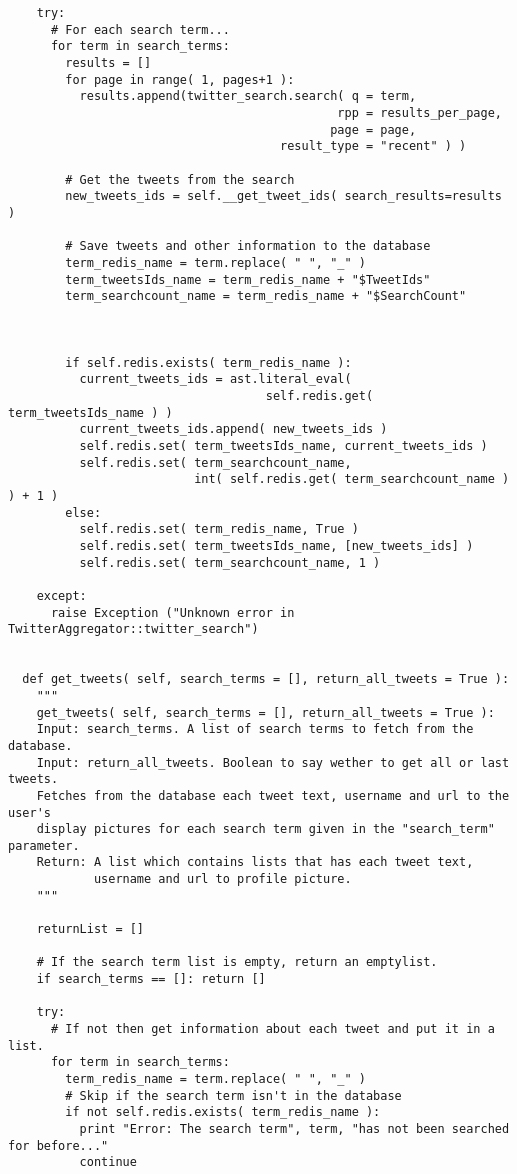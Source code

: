 \begin{verbatim}
    try:
      # For each search term...
      for term in search_terms:
        results = []
        for page in range( 1, pages+1 ):
          results.append(twitter_search.search( q = term, 
                                              rpp = results_per_page, 
                                             page = page, 
                                      result_type = "recent" ) )
        
        # Get the tweets from the search
        new_tweets_ids = self.__get_tweet_ids( search_results=results )
        
        # Save tweets and other information to the database
        term_redis_name = term.replace( " ", "_" )
        term_tweetsIds_name = term_redis_name + "$TweetIds"
        term_searchcount_name = term_redis_name + "$SearchCount"
        


        if self.redis.exists( term_redis_name ):
          current_tweets_ids = ast.literal_eval( 
                                    self.redis.get( term_tweetsIds_name ) )
          current_tweets_ids.append( new_tweets_ids )
          self.redis.set( term_tweetsIds_name, current_tweets_ids )
          self.redis.set( term_searchcount_name, 
                          int( self.redis.get( term_searchcount_name ) ) + 1 )
        else:
          self.redis.set( term_redis_name, True )
          self.redis.set( term_tweetsIds_name, [new_tweets_ids] )
          self.redis.set( term_searchcount_name, 1 )
    
    except:
      raise Exception ("Unknown error in TwitterAggregator::twitter_search")
  
  
  def get_tweets( self, search_terms = [], return_all_tweets = True ):
    """ 
    get_tweets( self, search_terms = [], return_all_tweets = True ):
    Input: search_terms. A list of search terms to fetch from the database.
    Input: return_all_tweets. Boolean to say wether to get all or last tweets.
    Fetches from the database each tweet text, username and url to the user's 
    display pictures for each search term given in the "search_term" parameter.
    Return: A list which contains lists that has each tweet text, 
            username and url to profile picture.
    """
    
    returnList = []
    
    # If the search term list is empty, return an emptylist.
    if search_terms == []: return []
    
    try:
      # If not then get information about each tweet and put it in a list.
      for term in search_terms:
        term_redis_name = term.replace( " ", "_" )
        # Skip if the search term isn't in the database
        if not self.redis.exists( term_redis_name ): 
          print "Error: The search term", term, "has not been searched for before..."
          continue
        

\end{verbatim}

